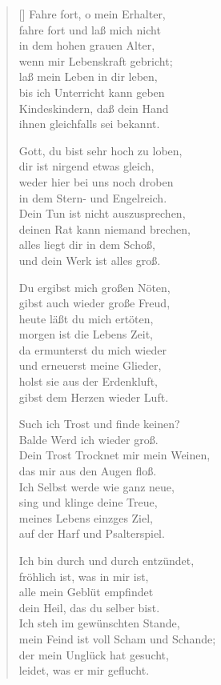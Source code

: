 \begin{multicols}{2}
\begin{verse}[\versewidth]
 Fahre fort, o mein Erhalter,\\
fahre fort und laß mich nicht\\
in dem hohen grauen Alter,\\
wenn mir Lebenskraft gebricht;\\
laß mein Leben in dir leben,\\
bis ich Unterricht kann geben\\
Kindeskindern, daß dein Hand\\
ihnen gleichfalls sei bekannt.

 Gott, du bist sehr hoch zu loben,\\
dir ist nirgend etwas gleich,\\
weder hier bei uns noch droben\\
in dem Stern- und Engelreich.\\
Dein Tun ist nicht auszusprechen,\\
deinen Rat kann niemand brechen,\\
alles liegt dir in dem Schoß,\\
und dein Werk ist alles groß.

 Du ergibst mich großen Nöten,\\
gibst auch wieder große Freud,\\
heute läßt du mich ertöten,\\
morgen ist die Lebens Zeit,\\
da ermunterst du mich wieder\\
und erneuerst meine Glieder,\\
holst sie aus der Erdenkluft,\\
gibst dem Herzen wieder Luft.

 Such ich Trost und finde keinen?\\
Balde Werd ich wieder groß.\\
Dein Trost Trocknet mir mein Weinen,\\
das mir aus den Augen floß.\\
Ich Selbst werde wie ganz neue,\\
sing und klinge deine Treue,\\
meines Lebens einzges Ziel,\\
auf der Harf und Psalterspiel.

 Ich bin durch und durch entzündet,\\
fröhlich ist, was in mir ist,\\
alle mein Geblüt empfindet\\
dein Heil, das du selber bist.\\
Ich steh im gewünschten Stande,\\
mein Feind ist voll Scham und Schande;\\
der mein Unglück hat gesucht,\\
leidet, was er mir geflucht.

\end{verse}
\end{multicols}
